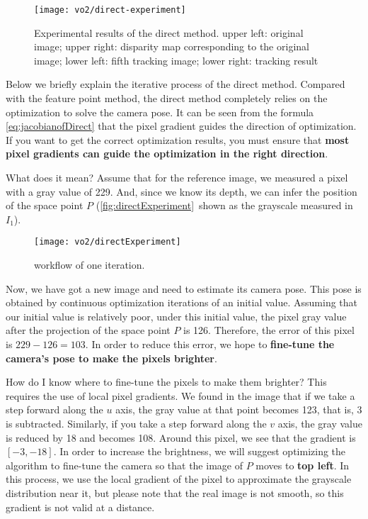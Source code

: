 \begin{figure}[!htp]
	\centering
	\texttt{[image: vo2/direct-experiment]}
	\caption{Experimental results of the direct method. upper left: original image; upper right: disparity map corresponding to the original image; lower left: fifth tracking image; lower right: tracking result}
	\label{fig:direct-experiment}
\end{figure}

Below we briefly explain the iterative process of the direct method. Compared with the feature point method, the direct method completely relies on the optimization to solve the camera pose. It can be seen from the formula \eqref{eq:jacobianofDirect} that the pixel gradient guides the direction of optimization. If you want to get the correct optimization results, you must ensure that \textbf{most pixel gradients can guide the optimization in the right direction}.

What does it mean? Assume that for the reference image, we measured a pixel with a gray value of 229. And, since we know its depth, we can infer the position of the space point $P$ (\autoref{fig:directExperiment}~shown as the grayscale measured in $I_1$).

\begin{figure}[!htp]
	\centering
	\texttt{[image: vo2/directExperiment]}
	\caption{workflow of one iteration.}
	\label{fig:directExperiment}
\end{figure}

Now, we have got a new image and need to estimate its camera pose. This pose is obtained by continuous optimization iterations of an initial value. Assuming that our initial value is relatively poor, under this initial value, the pixel gray value after the projection of the space point $P$ is 126. Therefore, the error of this pixel is $229-126=103$. In order to reduce this error, we hope to \textbf{fine-tune the camera's pose to make the pixels brighter}.

How do I know where to fine-tune the pixels to make them brighter? This requires the use of local pixel gradients. We found in the image that if we take a step forward along the $u$ axis, the gray value at that point becomes 123, that is, 3 is subtracted. Similarly, if you take a step forward along the $v$ axis, the gray value is reduced by 18 and becomes 108. Around this pixel, we see that the gradient is $[-3,-18]$. In order to increase the brightness, we will suggest optimizing the algorithm to fine-tune the camera so that the image of $P$ moves to \textbf{top left}. In this process, we use the local gradient of the pixel to approximate the grayscale distribution near it, but please note that the real image is not smooth, so this gradient is not valid at a distance.

